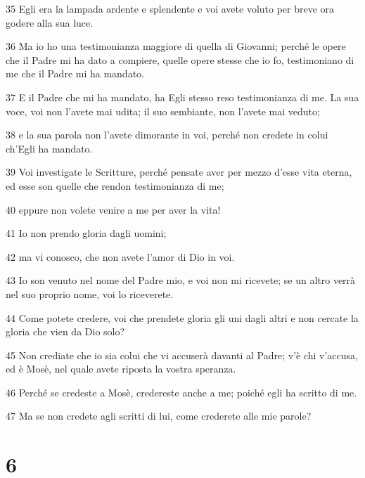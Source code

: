 \par 35 Egli era la lampada ardente e splendente e voi avete voluto per breve ora godere alla sua luce.
\par 36 Ma io ho una testimonianza maggiore di quella di Giovanni; perché le opere che il Padre mi ha dato a compiere, quelle opere stesse che io fo, testimoniano di me che il Padre mi ha mandato.
\par 37 E il Padre che mi ha mandato, ha Egli stesso reso testimonianza di me. La sua voce, voi non l'avete mai udita; il suo sembiante, non l'avete mai veduto;
\par 38 e la sua parola non l'avete dimorante in voi, perché non credete in colui ch'Egli ha mandato.
\par 39 Voi investigate le Scritture, perché pensate aver per mezzo d'esse vita eterna, ed esse son quelle che rendon testimonianza di me;
\par 40 eppure non volete venire a me per aver la vita!
\par 41 Io non prendo gloria dagli uomini;
\par 42 ma vi conosco, che non avete l'amor di Dio in voi.
\par 43 Io son venuto nel nome del Padre mio, e voi non mi ricevete; se un altro verrà nel suo proprio nome, voi lo riceverete.
\par 44 Come potete credere, voi che prendete gloria gli uni dagli altri e non cercate la gloria che vien da Dio solo?
\par 45 Non crediate che io sia colui che vi accuserà davanti al Padre; v'è chi v'accusa, ed è Mosè, nel quale avete riposta la vostra speranza.
\par 46 Perché se credeste a Mosè, credereste anche a me; poiché egli ha scritto di me.
\par 47 Ma se non credete agli scritti di lui, come crederete alle mie parole?

\chapter{6}

